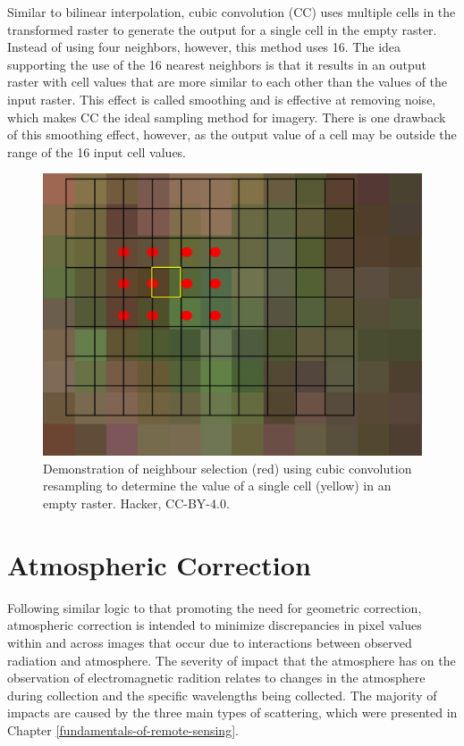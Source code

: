 \documentclass[
]{book}
\begin{document}
Similar to bilinear interpolation, cubic convolution (CC) uses multiple cells in the transformed raster to generate the output for a single cell in the empty raster. Instead of using four neighbors, however, this method uses 16. The idea supporting the use of the 16 nearest neighbors is that it results in an output raster with cell values that are more similar to each other than the values of the input raster. This effect is called smoothing and is effective at removing noise, which makes CC the ideal sampling method for imagery. There is one drawback of this smoothing effect, however, as the output value of a cell may be outside the range of the 16 input cell values.

\begin{figure}
\includegraphics[width=0.75\linewidth,height=0.75\textheight]{images/13-cubic_convolution} \caption{Demonstration of neighbour selection (red) using cubic convolution resampling to determine the value of a single cell (yellow) in an empty raster. Hacker, CC-BY-4.0.}\label{fig:13-cubic}
\end{figure}

\section{Atmospheric Correction}\label{atmospheric-correction}

Following similar logic to that promoting the need for geometric correction, atmospheric correction is intended to minimize discrepancies in pixel values within and across images that occur due to interactions between observed radiation and atmosphere. The severity of impact that the atmosphere has on the observation of electromagnetic radition relates to changes in the atmosphere during collection and the specific wavelengths being collected. The majority of impacts are caused by the three main types of scattering, which were presented in Chapter \ref{fundamentals-of-remote-sensing}.
\end{document}
